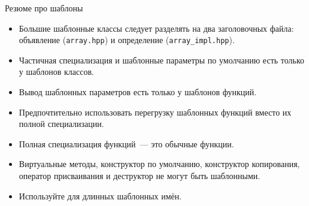 \documentclass{beamer}
\begin{document}
\begin{frame}[fragile]{Резюме про шаблоны}
\small
    \begin{itemize}
        \item
            Большие шаблонные классы следует разделять на два заголовочных файла:
            объявление (\texttt{array.hpp}) и определение (\texttt{array\_impl.hpp}).

        \item Частичная специализация и шаблонные параметры по умолчанию
            есть только у шаблонов классов.

        \item Вывод шаблонных параметров есть только у шаблонов функций.

        \item Предпочтительно использовать перегрузку шаблонных функций вместо
            их полной специализации.

        \item Полная специализация функций~--- это обычные функции.
    
        \item Виртуальные методы, конструктор по умолчанию, конструктор
            копирования, оператор присваивания и деструктор не могут быть
            шаблонными.
        \item Используйте  для длинных шаблонных имён.
    \end{itemize}
\end{frame}
\end{document}
